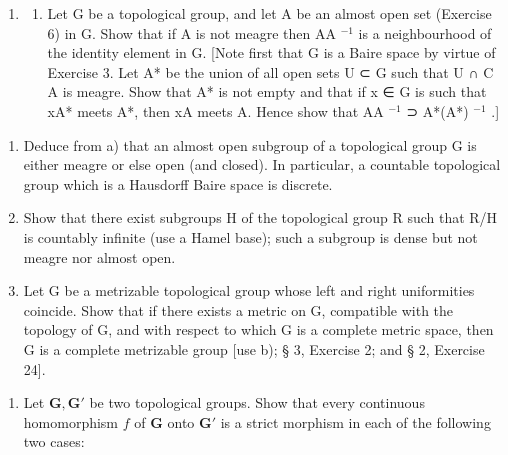 \begin{enumerate}
\def\labelenumi{\arabic{enumi})}
\setcounter{enumi}{26}
\tightlist
\item
  \begin{enumerate}
  \def\labelenumii{\alph{enumii})}
  \tightlist
  \item
    Let G be a topological group, and let A be an almost open set (Exercise 6) in G. Show that if A is not meagre then AA \(^{-1}\) is a neighbourhood of the identity element in G. {[}Note first that G is a Baire space by virtue of Exercise 3. Let A* be the union of all open sets U ⊂ G such that U ∩ C A is meagre. Show that A* is not empty and that if x ∈ G is such that xA* meets A*, then xA meets A. Hence show that AA \(^{-1}\) ⊃ A*(A*) \(^{-1}\) .{]}
  \end{enumerate}
\end{enumerate}

\begin{enumerate}
\def\labelenumi{\alph{enumi})}
\setcounter{enumi}{1}
\item
  Deduce from a) that an almost open subgroup of a topological group G is either meagre or else open (and closed). In particular, a countable topological group which is a Hausdorff Baire space is discrete.
\item
  Show that there exist subgroups H of the topological group R such that R/H is countably infinite (use a Hamel base); such a subgroup is dense but not meagre nor almost open.
\item
  Let G be a metrizable topological group whose left and right uniformities coincide. Show that if there exists a metric on G, compatible with the topology of G, and with respect to which G is a complete metric space, then G is a complete metrizable group {[}use b); § 3, Exercise 2; and § 2, Exercise 24{]}.
\end{enumerate}

\begin{enumerate}
\def\labelenumi{\arabic{enumi})}
\setcounter{enumi}{27}
\tightlist
\item
  Let \(\mathbf{G}, \mathbf{G}'\) be two topological groups. Show that every continuous homomorphism \(f\) of \(\mathbf{G}\) onto \(\mathbf{G}'\) is a strict morphism in each of the following two cases:
\end{enumerate}

